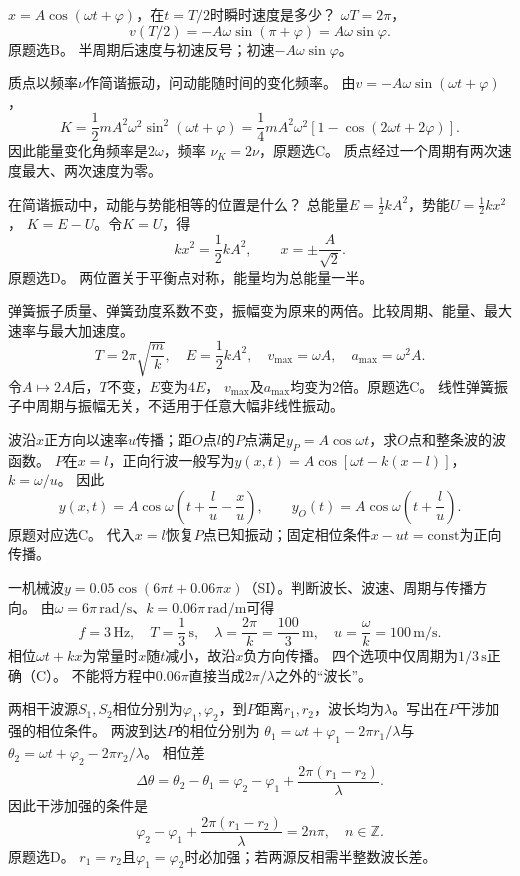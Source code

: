 \problemtext $x=A\cos(\omega t+\varphi)$，在$t=T/2$时瞬时速度是多少？
\workings
$\omega T=2\pi$，
\[
v(T/2)=-A\omega\sin(\pi+\varphi)
=\boxed{A\omega\sin\varphi}.
\]
原题选B。
\crosscheck 半周期后速度与初速反号；初速$-A\omega\sin\varphi$。

\problemtext 质点以频率$\nu$作简谐振动，问动能随时间的变化频率。
\workings
由$v=-A\omega\sin(\omega t+\varphi)$，
\[
K=\frac12mA^2\omega^2\sin^2(\omega t+\varphi)
=\frac14mA^2\omega^2[1-\cos(2\omega t+2\varphi)].
\]
因此能量变化角频率是$2\omega$，频率
$\boxed{\nu_K=2\nu}$，原题选C。
\crosscheck 质点经过一个周期有两次速度最大、两次速度为零。

\problemtext 在简谐振动中，动能与势能相等的位置是什么？
\workings
总能量$E=\frac12kA^2$，势能$U=\frac12kx^2$，
$K=E-U$。令$K=U$，得
\[
kx^2=\frac12kA^2,\qquad
\boxed{x=\pm\frac{A}{\sqrt2}}.
\]
原题选D。
\crosscheck 两位置关于平衡点对称，能量均为总能量一半。

\problemtext 弹簧振子质量、弹簧劲度系数不变，振幅变为原来的两倍。比较周期、能量、最大速率与最大加速度。
\workings
\[
T=2\pi\sqrt{\frac mk},\quad
E=\frac12kA^2,\quad
v_{\max}=\omega A,\quad
a_{\max}=\omega^2 A.
\]
令$A\mapsto2A$后，$T$不变，$E$变为$4E$，
$v_{\max}$及$a_{\max}$均变为2倍。原题选C。
\crosscheck 线性弹簧振子中周期与振幅无关，不适用于任意大幅非线性振动。

\problemtext 波沿$x$正方向以速率$u$传播；距$O$点$l$的$P$点满足$y_P=A\cos\omega t$，求$O$点和整条波的波函数。
\workings
$P$在$x=l$，正向行波一般写为$y(x,t)=A\cos[\omega t-k(x-l)]$，$k=\omega/u$。
因此
\[
\boxed{y(x,t)=A\cos\omega\left(t+\frac lu-\frac xu\right)},\qquad
\boxed{y_O(t)=A\cos\omega\left(t+\frac lu\right)}.
\]
原题对应选C。
\crosscheck 代入$x=l$恢复$P$点已知振动；固定相位条件$x-ut=\mathrm{const}$为正向传播。

\problemtext 一机械波$y=0.05\cos(6\pi t+0.06\pi x)$（SI）。判断波长、波速、周期与传播方向。
\workings
由$\omega=6\pi\,\mathrm{rad/s}$、$k=0.06\pi\,\mathrm{rad/m}$可得
\[
f=3\,\mathrm{Hz},\quad
\boxed{T=\frac13\,\mathrm s},\quad
\lambda=\frac{2\pi}{k}=\frac{100}{3}\,\mathrm m,\quad
u=\frac{\omega}{k}=100\,\mathrm{m/s}.
\]
相位$\omega t+kx$为常量时$x$随$t$减小，故沿$x$负方向传播。
四个选项中仅周期为$1/3\,\mathrm s$正确（C）。
\crosscheck 不能将方程中$0.06\pi$直接当成$2\pi/\lambda$之外的“波长”。

\problemtext 两相干波源$S_1,S_2$相位分别为$\varphi_1,\varphi_2$，到$P$距离$r_1,r_2$，波长均为$\lambda$。写出在$P$干涉加强的相位条件。
\workings
两波到达$P$的相位分别为
$\theta_1=\omega t+\varphi_1-2\pi r_1/\lambda$与
$\theta_2=\omega t+\varphi_2-2\pi r_2/\lambda$。
相位差
\[
\Delta\theta=\theta_2-\theta_1
=\varphi_2-\varphi_1+\frac{2\pi(r_1-r_2)}{\lambda}.
\]
因此干涉加强的条件是
\[
\boxed{\varphi_2-\varphi_1+\frac{2\pi(r_1-r_2)}{\lambda}=2n\pi},
\quad n\in\mathbb Z.
\]
原题选D。
\crosscheck $r_1=r_2$且$\varphi_1=\varphi_2$时必加强；若两源反相需半整数波长差。


